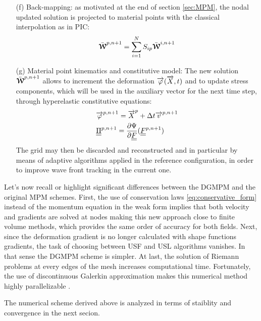 \begin{itemize}
\item[(f)] Back-mapping: as motivated at the end of section \ref{sec:MPM}, the nodal updated solution is projected to material points with the classical interpolation as in PIC:
  \begin{equation}
    \bar{{\boldsymbol{\mathcal{W}}}}^{p,n+1} = \sum_{i=1}^{N} S_{ip}\bar{{\boldsymbol{\mathcal{W}}}}^{i,n+1}
  \end{equation}
\item[(g)] Material point kinematics and constitutive model: The new solution $\bar{{\boldsymbol{\mathcal{W}}}}^{p,n+1}$ allows to increment the deformation ${\overrightarrow{\varphi}}({\overrightarrow{X}},t)$ and to update stress components, which will be used in the auxiliary vector for the next time step, through hyperelastic constitutive equations:
  \begin{align}
    & {\overrightarrow{\varphi}}^{p,n+1} = {\overrightarrow{X}}^p + \Delta t {\overrightarrow{v}}^{p,n+1} \\
    & {\underline{\underline{\Pi}}}^{p,n+1} =  \frac{\partial \Psi}{\partial {\underline{\underline{F}}}}({\underline{\underline{F}}}^{p,n+1})
  \end{align}
  The grid may then be discarded and reconstructed and in particular by means of adaptive algorithms applied in the reference configuration, in order to improve wave front tracking in the current one.
\end{itemize}

Let's now recall or highlight significant differences between the DGMPM and the original MPM schemes. 
First, the use of conservation laws \eqref{eq:conservative_form} instead of the momentum equation in the weak form implies that both velocity and gradients are solved at nodes making this new approach close to finite volume methods, which provides the same order of accuracy for both fields. 
Next, since the deformation gradient is no longer calculated with shape functions gradients, the task of choosing between USF and USL algorithms vanishes. In that sense the DGMPM scheme is simpler.
At last, the solution of Riemann problems at every edges of the mesh increases computational time. Fortunately, the use of discontinuous Galerkin approximation makes this numerical method highly parallelizable \cite{Cockburn}.

The numerical scheme derived above is analyzed in terms of staiblity and convergence in the next secion.


